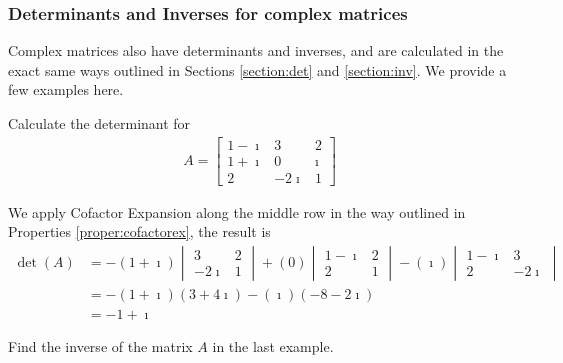 \subsubsection{Determinants and Inverses for complex matrices}
Complex matrices also have determinants and inverses, and are calculated in the exact same ways outlined in Sections \ref{section:det} and \ref{section:inv}. We provide a few examples here.

\begin{exmp}
Calculate the determinant for
\begin{align*}
A = 
\begin{bmatrix}
1-\imath & 3 & 2 \\
1+\imath & 0 & \imath \\
2 & -2\imath & 1
\end{bmatrix}
\end{align*}
\end{exmp}
\begin{solution}
We apply Cofactor Expansion along the middle row in the way outlined in Properties \ref{proper:cofactorex}, the result is
\begin{align*}
\det(A) &= -(1+\imath)
\begin{vmatrix}
3 & 2 \\
-2\imath & 1
\end{vmatrix}
+ (0)
\begin{vmatrix}
1-\imath & 2 \\
2 & 1
\end{vmatrix}
- (\imath)
\begin{vmatrix}
1-\imath & 3 \\
2 & -2\imath
\end{vmatrix} \\
&= -(1+\imath)(3+4\imath) - (\imath)(-8-2\imath) \\
&= -1 + \imath
\end{align*}  
\end{solution}

\begin{exmp}
Find the inverse of the matrix $A$ in the last example.
\end{exmp}

